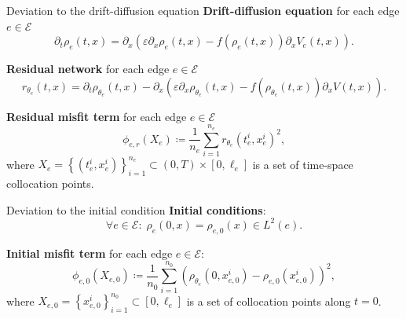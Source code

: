 \documentclass[9pt]{beamer}
\begin{document}
\begin{frame}{Deviation to the drift-diffusion equation}
    \textbf{Drift-diffusion equation} for each edge $e \in \mathcal{E}$
    \begin{equation*} 
        \partial_t \rho_e  \left( t,x \right)  = \partial_x  \left( \varepsilon \partial_x \rho_e  \left( t,x \right)  - f \left( \rho_e  \left( t,x \right)   \right)  \partial_x V_e  \left( t,x \right)  \right).
    \end{equation*}

    \vspace{3mm}

    \textbf{Residual network} for each edge $e \in \mathcal{E}$
    \begin{equation*}
        r_{\theta_e} \left( t,x \right)=\partial_t \rho_{\theta_e} \left( t,x \right) - \partial_x   \left(  \varepsilon \partial_x  \rho_{\theta_e} \left( t,x \right) - f \left( \rho_{\theta_e} \left( t,x \right) \right) \partial_x V \left( t,x \right) \right).
    \end{equation*}

    \vspace{3mm}

    \textbf{Residual misfit term} for each edge $e \in \mathcal{E}$
    \begin{equation*} 
        \phi_{e,r}  \left( X_e \right) \coloneqq \frac{1}{n_e} \sum_{i=1}^{n_e} r_{\theta_e}  \left( t_e^i, x_e^i  \right)^2,
    \end{equation*} 
    where $X_e = \left\{ \left( t_e^i, x_e^i \right) \right\}_{i=1}^{n_e} \subset \left( 0, T \right) \times \left[0, \ell_e\right]$ is a set of time-space collocation points. \\
\end{frame}



\begin{frame}{Deviation to the initial condition}
    \textbf{Initial conditions}:
    \begin{equation*}
        \forall e \in \mathcal{E} \colon \; \rho_e \left( 0,x \right)  = \rho_{e, 0} \left( x \right) \in L^2 \left( e \right).
    \end{equation*}

    \vspace{3mm}

    \textbf{Initial misfit term} for each edge $e \in \mathcal{E}$:
    \begin{equation*} 
        \phi_{e,0}  \left( X_{e,0} \right) \coloneqq \frac{1}{n_0} \sum_{i=1}^{n_0}  \left( \rho_{\theta_e}  \left( 0,x_{e,0}^i \right) - \rho_{e,0} \left( x_{e,0}^i \right) \right)^2, 
    \end{equation*} 
    where $X_{e,0} = \left\{ x_{e,0}^i \right\}_{i=1}^{n_0} \subset \left[0, \ell_e\right]$ is a set of collocation points along $t=0$.
\end{frame}
\end{document}
